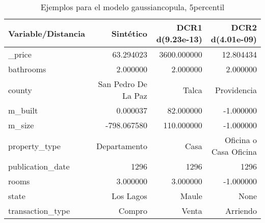 \begin{table}[H]
\centering
\fontsize{10}{14}\selectfont
\caption{Ejemplos para el modelo gaussiancopula, 5percentil}
\label{table-example-economicos-b-2-gaussiancopula-5p}
\begin{tabular}{|l|r|r|r|}
\hline
\rowcolor[gray]{0.8}
Variable/Distancia & Sintético & DCR1 d(9.23e-13) & DCR2 d(4.01e-09) \\
\hline \_price & \cellcolor[rgb]{0.9, 0.54, 0.52} 63.294023 & 3600.000000 & 12.804434 \\
\hline bathrooms & \cellcolor[rgb]{0.9, 0.54, 0.52} 2.000000 & \cellcolor[rgb]{0.9, 0.54, 0.52} 2.000000 & \cellcolor[rgb]{0.9, 0.54, 0.52} 2.000000 \\
\hline county & \cellcolor[rgb]{0.9, 0.54, 0.52} San Pedro De La Paz & Talca & Providencia \\
\hline m\_built & \cellcolor[rgb]{0.9, 0.54, 0.52} 0.000037 & 82.000000 & \cellcolor[rgb]{0.9, 0.54, 0.52} -1.000000 \\
\hline m\_size & \cellcolor[rgb]{0.9, 0.54, 0.52} -798.067580 & 110.000000 & \cellcolor[rgb]{0.9, 0.54, 0.52} -1.000000 \\
\hline property\_type & \cellcolor[rgb]{0.9, 0.54, 0.52} Departamento & Casa & Oficina o Casa Oficina \\
\hline publication\_date & \cellcolor[rgb]{0.9, 0.54, 0.52} 1296 & \cellcolor[rgb]{0.9, 0.54, 0.52} 1296 & \cellcolor[rgb]{0.9, 0.54, 0.52} 1296 \\
\hline rooms & \cellcolor[rgb]{0.9, 0.54, 0.52} 3.000000 & \cellcolor[rgb]{0.9, 0.54, 0.52} 3.000000 & -1.000000 \\
\hline state & \cellcolor[rgb]{0.9, 0.54, 0.52} Los Lagos & Maule & None \\
\hline transaction\_type & \cellcolor[rgb]{0.9, 0.54, 0.52} Compro & Venta & Arriendo \\
\hline
\end{tabular}
\end{table}
